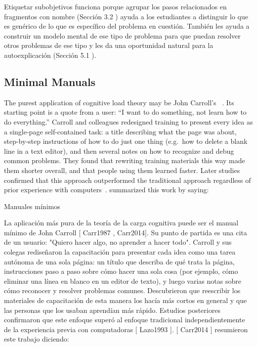 {Etiquetar subobjetivos funciona porque agrupar los pasos relacionados en fragmentos con nombre (Sección  3.2 ) ayuda a los estudiantes a distinguir lo que es genérico de lo que es específico del problema en cuestión. También les ayuda a construir un modelo mental de ese tipo de problema para que puedan resolver otros problemas de ese tipo y les da una oportunidad natural para la autoexplicación (Sección  5.1 ).

\subsection*{Minimal Manuals}

The purest application of cognitive load theory may be John Carroll's
~\cite{Carr1987,Carr2014}.
Its starting point is a quote from a user:
``I want to do something, not learn how to do everything.''
Carroll and colleagues redesigned training to present every idea as a single-page self-contained task:
a title describing what the page was about,
step-by-step instructions of how to do just one thing
(e.g.\ how to delete a blank line in a text editor),
and then several notes on how to recognize and debug common problems.
They found that rewriting training materials this way made them shorter overall,
and that people using them learned faster.
Later studies confirmed that this approach outperformed the traditional approach
regardless of prior experience with computers~\cite{Lazo1993}.
\cite{Carr2014} summarized this work by saying:

Manuales mínimos

La aplicación más pura de la teoría de la carga cognitiva puede ser el manual mínimo de John Carroll  [ Carr1987 , Carr2014]. Su punto de partida es una cita de un usuario: "Quiero hacer algo, no aprender a hacer todo". Carroll y sus colegas rediseñaron la capacitación para presentar cada idea como una tarea autónoma de una sola página: un título que describa de qué trata la página, instrucciones paso a paso sobre cómo hacer una sola cosa (por ejemplo, cómo eliminar una línea en blanco en un editor de texto), y luego varias notas sobre cómo reconocer y resolver problemas comunes. Descubrieron que reescribir los materiales de capacitación de esta manera los hacía más cortos en general y que las personas que los usaban aprendían más rápido. Estudios posteriores confirmaron que este enfoque superó al enfoque tradicional independientemente de la experiencia previa con computadoras [ Lazo1993 ]. [ Carr2014 ] resumieron este trabajo diciendo:

}
